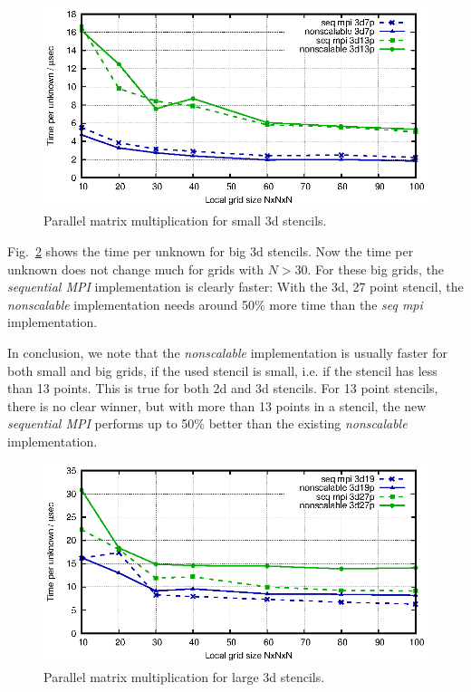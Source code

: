 \begin{figure}[tbp]
	\centering
	\vspace*{-2.5mm}\includegraphics[width=1\textwidth]{times_3dsmall}
	\caption{Parallel matrix multiplication for small 3d stencils. } 
	\label{fig:mat_ex_test_ex2_times_3dsmall}
\end{figure}

Fig.~\ref{fig:mat_ex_test_ex2_times_3dlarge} shows the time per unknown for big 3d stencils. Now the time per unknown does not change much for grids with $N > 30$. For these big grids, the \textit{sequential MPI} implementation is clearly faster: With the 3d, 27 point stencil, the \textit{nonscalable} implementation needs around 50\% more time than the \textit{seq mpi} implementation. 

In conclusion, we note that the \textit{nonscalable} implementation is usually faster for both small and big grids, if the used stencil is small, i.e. if the stencil has less than 13 points. This is true for both 2d and 3d stencils. For 13 point stencils, there is no clear winner, but with more than 13 points in a stencil, the new \textit{sequential MPI} performs up to 50\% better than the existing \textit{nonscalable} implementation.

\begin{figure}[tbp]
	\centering
	\vspace*{-2.5mm}\includegraphics[width=1\textwidth]{times_3dlarge}
	\caption{Parallel matrix multiplication for large 3d stencils.} 
	\label{fig:mat_ex_test_ex2_times_3dlarge}
\end{figure}

